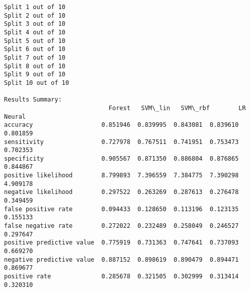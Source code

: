 \documentclass[11pt]{article}
\begin{document}
    \begin{Verbatim}[commandchars=\\\{\}]
Split 1 out of 10
Split 2 out of 10
Split 3 out of 10
Split 4 out of 10
Split 5 out of 10
Split 6 out of 10
Split 7 out of 10
Split 8 out of 10
Split 9 out of 10
Split 10 out of 10

Results Summary:
                             Forest   SVM\_lin   SVM\_rbf        LR    Neural
accuracy                   0.851946  0.839995  0.843081  0.839610  0.801859
sensitivity                0.727978  0.767511  0.741951  0.753473  0.702353
specificity                0.905567  0.871350  0.886804  0.876865  0.844867
positive likelihood        8.799893  7.396559  7.384775  7.390298  4.909178
negative likelihood        0.297522  0.263269  0.287613  0.276478  0.349459
false positive rate        0.094433  0.128650  0.113196  0.123135  0.155133
false negative rate        0.272022  0.232489  0.258049  0.246527  0.297647
positive predictive value  0.775919  0.731363  0.747641  0.737093  0.669270
negative predictive value  0.887152  0.898619  0.890479  0.894471  0.869677
positive rate              0.285678  0.321505  0.302999  0.313414  0.320310

    \end{Verbatim}


    
    
    
    
\end{document}

